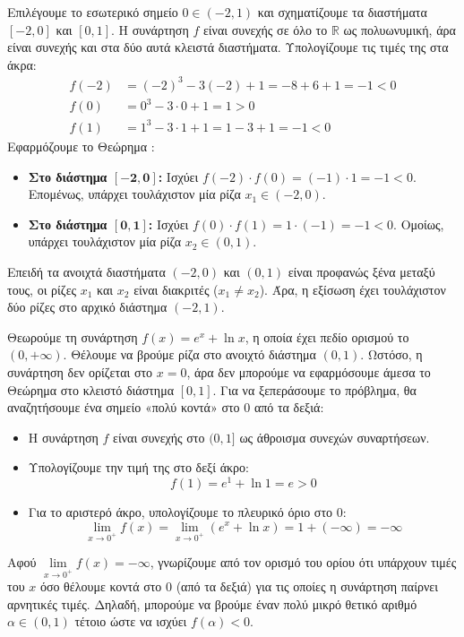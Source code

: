 Επιλέγουμε το εσωτερικό σημείο $0 \in (-2, 1)$ και σχηματίζουμε τα διαστήματα $[-2, 0]$ και $[0, 1]$.
Η συνάρτηση $f$ είναι συνεχής σε όλο το $\mathbb{R}$ ως πολυωνυμική, άρα είναι συνεχής και στα δύο αυτά κλειστά διαστήματα.
Υπολογίζουμε τις τιμές της στα άκρα:
\begin{align*}
    f(-2) &= (-2)^3 - 3(-2) + 1 = -8 + 6 + 1 = -1 < 0 \\
    f(0) &= 0^3 - 3\cdot 0 + 1 = 1 > 0 \\
    f(1) &= 1^3 - 3\cdot 1 + 1 = 1 - 3 + 1 = -1 < 0
\end{align*}
Εφαρμόζουμε το Θεώρημα :
\begin{itemize}
    \item \textbf{Στο διάστημα $\mathbf{[-2, 0]}$:} Ισχύει $f(-2) \cdot f(0) = (-1) \cdot 1 = -1 < 0$. Επομένως, υπάρχει τουλάχιστον μία ρίζα $x_1 \in (-2, 0)$.
    \item \textbf{Στο διάστημα $\mathbf{[0, 1]}$:} Ισχύει $f(0) \cdot f(1) = 1 \cdot (-1) = -1 < 0$. Ομοίως, υπάρχει τουλάχιστον μία ρίζα $x_2 \in (0, 1)$.
\end{itemize}
Επειδή τα ανοιχτά διαστήματα $(-2, 0)$ και $(0, 1)$ είναι προφανώς ξένα μεταξύ τους, οι ρίζες $x_1$ και $x_2$ είναι διακριτές ($x_1 \neq x_2$). 
Άρα, η εξίσωση έχει τουλάχιστον δύο ρίζες στο αρχικό διάστημα $(-2, 1)$.\\


\lysh
Θεωρούμε τη συνάρτηση $f(x) = e^x + \ln x$, η οποία έχει πεδίο ορισμού το $(0, +\infty)$. 
Θέλουμε να βρούμε ρίζα στο ανοιχτό διάστημα $(0, 1)$. Ωστόσο, η συνάρτηση δεν ορίζεται στο $x=0$, άρα δεν μπορούμε να εφαρμόσουμε άμεσα το Θεώρημα  στο κλειστό διάστημα $[0, 1]$.
Για να ξεπεράσουμε το πρόβλημα, θα αναζητήσουμε ένα σημείο «πολύ κοντά» στο $0$ από τα δεξιά:
\begin{itemize}
    \item Η συνάρτηση $f$ είναι συνεχής στο $(0, 1]$ ως άθροισμα συνεχών συναρτήσεων.
    \item Υπολογίζουμε την τιμή της στο δεξί άκρο: 
    \[ f(1) = e^1 + \ln 1 = e > 0 \]
    \item Για το αριστερό άκρο, υπολογίζουμε το πλευρικό όριο στο 0:
    \[ \lim\limits_{x\to 0^+} f(x) = \lim\limits_{x\to 0^+} (e^x + \ln x) = 1 + (-\infty) = -\infty \]
\end{itemize}
Αφού $\lim\limits_{x\to 0^+} f(x) = -\infty$, γνωρίζουμε από τον ορισμό του ορίου ότι υπάρχουν τιμές του $x$ όσο θέλουμε κοντά στο 0 (από τα δεξιά) για τις οποίες η συνάρτηση παίρνει αρνητικές τιμές. Δηλαδή, μπορούμε να βρούμε έναν πολύ μικρό θετικό αριθμό $\alpha \in (0, 1)$ τέτοιο ώστε να ισχύει $f(\alpha) < 0$.

